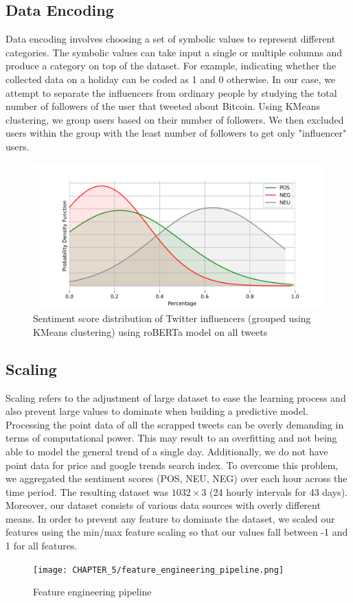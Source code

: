\subsection*{Data Encoding}
Data encoding involves choosing a set of symbolic values to represent different categories. The symbolic values can take input a single or multiple columns and produce a category on top of the dataset. For example, indicating whether the collected data on a holiday can be coded as 1 and 0 otherwise. In our case, we attempt to separate the influencers from ordinary people by studying the total number of followers of the user that tweeted about Bitcoin. Using KMeans clustering, we group users based on their number of followers. We then excluded users within the group with the least number of followers to get only "influencer" users.
\begin{figure}[H]
    \centering
    \includegraphics[scale=0.6]{CHAPTER_5/sentiment_score_distribution_python_inf.png}
    \caption{Sentiment score distribution of Twitter influencers (grouped using KMeans clustering) using roBERTa model on all tweets}
    \label{sentiment_score_distribution_influencers}
 \end{figure}
\subsection*{Scaling}
Scaling refers to the adjustment of large dataset to ease the learning process and also prevent large values to dominate when building a predictive model.
Processing the point data of all the scrapped tweets can be overly demanding in terms of computational power. This may result to an overfitting and not being able to model the general trend of a single day. Additionally, we do not have point data for price and google trends search index. To overcome this problem, we aggregated the sentiment scores (POS, NEU, NEG) over each hour across the time period. The resulting dataset was $1032 \times 3$ (24 hourly intervals for 43 days).
Moreover, our dataset consists of various data sources with overly different means. In order to prevent any feature to dominate the dataset, we scaled our features using the min/max feature scaling so that our values fall between -1 and 1 for all features.
\begin{figure}[H]
    \centering
    \texttt{[image: CHAPTER\_5/feature\_engineering\_pipeline.png]}
    \caption{Feature engineering pipeline}
    \label{feature_eng_pipeline}
 \end{figure}
